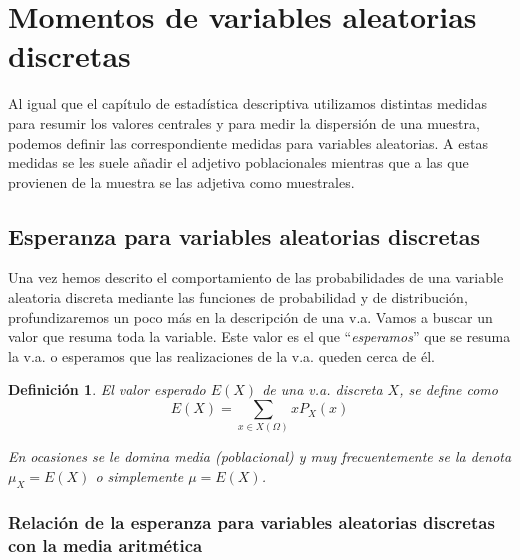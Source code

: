 \documentclass[12pt]{report}
\newtheorem{definition}{Definici\'on}
\begin{document}

\section{Momentos de variables aleatorias discretas}

Al igual que el capítulo de estadística descriptiva  utilizamos distintas medidas para
resumir los valores centrales y para medir la dispersión de una muestra, podemos definir
las correspondiente medidas para variables aleatorias. A estas medidas se les suele añadir
el adjetivo poblacionales mientras que a las que provienen de la muestra se las adjetiva
como muestrales.

\subsection{Esperanza para variables aleatorias discretas}

Una vez hemos descrito el comportamiento de las probabilidades de una variable aleatoria
discreta  mediante las funciones de probabilidad y de distribución, profundizaremos un poco
más en la descripción  de una v.a. Vamos a buscar un valor que resuma toda la variable.
Este valor es el que ``\emph{esperamos}'' que se resuma la v.a. o esperamos que las
realizaciones de la v.a. queden cerca de él.


\begin{definition}
    El valor esperado $E(X)$ de una v.a. discreta $X$, se define como
    $$E(X)=\sum_{x\in X(\Omega)} x P_{X}(x)$$

    En ocasiones se le domina media (poblacional) y muy frecuentemente se la denota
    $\mu_{X}=E(X)$ o simplemente $\mu=E(X)$.
    \end{definition}

\subsubsection{Relación de la esperanza para variables aleatorias
discretas con la media aritmética}
\end{document}
